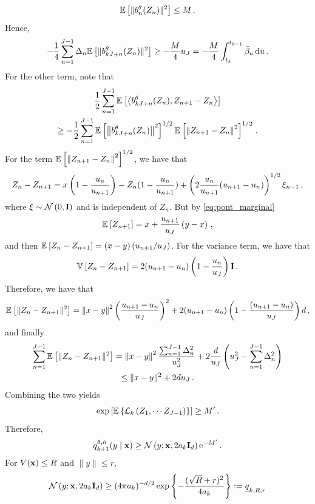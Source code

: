 \documentclass[11pt]{article}
\theoremstyle{plain}
\theoremstyle{definition}
\theoremstyle{remark}
\begin{document}
$$
\mathbb{E} \left[ \|b_n^\theta(Z_n)\|^2  \right] \le M \,.
$$
Hence,
$$
-\frac14 \sum_{n=1}^{J-1} \Delta_n \mathbb{E} \left[ \|b_{kJ+n}^\theta(Z_n)\|^2 \right] \ge - \frac{M}{4} u_J = - \frac{M}{4}  \int_{t_k}^{t_{k+1}} \bar{\beta}_{u}\,\mathrm{d} u \,.
$$
%
For the other term, note that 
\begin{multline}
    \frac12 \sum_{n=1}^{J-1} \mathbb{E}_{}\left[\left<b_{kJ+n}^\theta(Z_n), Z_{n+1}-Z_n\right>\right] \\
    \ge -\frac{1}{2}\sum_{n=1}^{J-1} \mathbb{E}_{}\left[\left\|b_{kJ+n}^\theta(Z_n)\right\|^2\right]^{1/2}\mathbb{E}_{}\left[\left\|Z_{n+1}-Z_n\right\|^2\right]^{1/2} \,.
\end{multline}
%
For the term $\mathbb{E}_{}\left[\left\|Z_{n+1}-Z_n\right\|^2\right]^{1/2}$, we have that
\begin{equation*}
    Z_{n} - Z_{n+1} = x \left(1 - \frac{u_n}{u_{n+1}}\right) - Z_n(1 - \frac{u_n}{u_{n+1}}) + \left(2\frac{u_n}{u_{n+1}}(u_{n+1} - u_n)\right)^{1/2}{\xi}_{n-1} \,,
\end{equation*}
where $\xi \sim \gaussiand{0}{\Id}$ and is independent of $Z_n$.
But by \eqref{eq:pont_marginal}
\begin{equation*}
    \mathbb{E}_{}\left[Z_{n+1}\right] = x + \frac{u_{n+1}}{u_J}\left(y - x\right) \,, 
\end{equation*}
and then $\mathbb{E}_{}\left[Z_{n} - Z_{n+1}\right] = (x - y) \left(u_{n+1} \middle/u_J\right)$.
For the variance term, we have that
\begin{equation*}
    \mathbb{V}_{}\left[Z_{n} - Z_{n+1}\right] = 2 (u_{n+1} - u_n) \left(1 - \frac{u_n}{u_J}\right) \mathbf{I} \,. 
\end{equation*}
Therefore, we have that
\begin{equation*}
    \mathbb{E}_{}\left[\|Z_{n} - Z_{n+1}\|^2\right] = \left\|x - y\right\|^2 \left(\frac{u_{n+1}-u_n}{u_J}\right)^2 + 2(u_{n+1}-u_n) \left(1 - \frac{(u_{n+1}-u_n)}{u_J}\right) d \,,
\end{equation*}
and finally 
\begin{multline*}
    \sum_{n=1}^{J-1}\mathbb{E}_{}\left[\|Z_{n} - Z_{n+1}\|^2\right] = \left\|x - y\right\|^2 \frac{\sum_{n=1}^{J-1} \Delta_n^2}{u_J^2} + 2 \frac{d}{u_J} \left(u_J^2 - \sum_{n=1}^{J-1}\Delta_n^2\right)\\
    \leq \|x - y\|^2  + 2 d u_J\,.
\end{multline*}
Combining the two yields
$$
\exp\left[\mathbb{E}\left\{ \mathcal L_k \left( Z_{1}, \cdots Z_{J - 1} \right) \right\} \right]  \ge M' \,.
$$
Therefore, 
$$
q_{k+1}^{\theta,h} (y\mid\x) \ge \gaussiand{y;\x}{2a_k\Id_\xdim} \rme^{-M'} \eqsp.
$$
For $V(\mathbf{x})\le R$ and $\|y\|\le r$,
$$
\gaussiand{y ; \x}{ 2 a_k \Id_\xdim} \ge (4\pi a_k)^{-\xdim/2} \exp\left\{ -\frac{ (\sqrt R+r)^2 }{4a_k} \right\} %
\eqdef \underline{q}_{k,R,r}
$$
\end{document}
